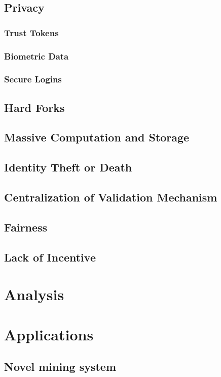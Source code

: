 \documentclass{article}
\begin{document}
\subsection{Privacy}
\subsubsection*{Trust Tokens}
\subsubsection*{Biometric Data}
\subsubsection*{Secure Logins}

\subsection{Hard Forks}
\subsection{Massive Computation and Storage}
\subsection{Identity Theft or Death}
\subsection{Centralization of Validation Mechanism}
\subsection{Fairness}
\subsection{Lack of Incentive}


\section{Analysis}


\section{Applications}

\subsection{Novel mining system}
\end{document}
